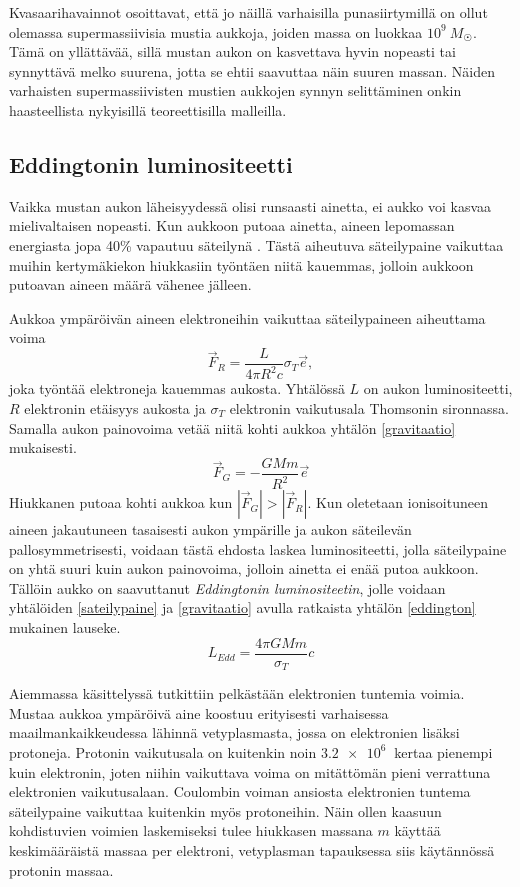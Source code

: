 \documentclass[12pt,a4paper]{article}
\begin{document}
Kvasaarihavainnot osoittavat, että jo näillä varhaisilla punasiirtymillä on ollut olemassa supermassiivisia mustia aukkoja, joiden massa on luokkaa $10^9 ~M_{\astrosun}$. Tämä on yllättävää, sillä mustan aukon on kasvettava hyvin nopeasti tai synnyttävä melko suurena, jotta se ehtii saavuttaa näin suuren massan. Näiden varhaisten supermassiivisten mustien aukkojen synnyn selittäminen onkin haasteellista nykyisillä teoreettisilla malleilla. \cite{li}

\subsection{Eddingtonin luminositeetti}
Vaikka mustan aukon läheisyydessä olisi runsaasti ainetta, ei aukko voi kasvaa mielivaltaisen nopeasti. Kun aukkoon putoaa ainetta, aineen lepomassan energiasta jopa 40\% vapautuu säteilynä \cite{pringle}. Tästä aiheutuva säteilypaine vaikuttaa muihin kertymäkiekon hiukkasiin työntäen niitä kauemmas, jolloin aukkoon putoavan aineen määrä vähenee jälleen. \cite{bartelmann}

Aukkoa ympäröivän aineen elektroneihin vaikuttaa säteilypaineen aiheuttama voima
\begin{equation}\label{sateilypaine}
	\vec{F}_R = \frac{L}{4 \pi R^2 c} \sigma_T \vec{e},
\end{equation}
joka työntää elektroneja kauemmas aukosta. Yhtälössä $L$ on aukon luminositeetti, $R$ elektronin etäisyys aukosta ja $\sigma_T$ elektronin vaikutusala Thomsonin sironnassa. Samalla aukon painovoima vetää niitä kohti aukkoa yhtälön \ref{gravitaatio} mukaisesti.
\begin{equation}\label{gravitaatio}
	\vec{F}_G = -\frac{GMm}{R^2}\vec{e}
\end{equation}
Hiukkanen putoaa kohti aukkoa kun $|\vec{F}_G|>|\vec{F}_R|$. Kun oletetaan ionisoituneen aineen jakautuneen tasaisesti aukon ympärille ja aukon säteilevän pallosymmetrisesti, voidaan tästä ehdosta laskea luminositeetti, jolla säteilypaine on yhtä suuri kuin aukon painovoima, jolloin ainetta ei enää putoa aukkoon. Tällöin aukko on saavuttanut \textit{Eddingtonin luminositeetin}, jolle voidaan yhtälöiden \ref{sateilypaine} ja \ref{gravitaatio} avulla ratkaista yhtälön \ref{eddington} mukainen lauseke. \cite{pringle} %
\begin{equation}\label{eddington}
	L_{Edd}=\frac{4 \pi GMm}{\sigma_T}c
\end{equation}

Aiemmassa käsittelyssä tutkittiin pelkästään elektronien tuntemia voimia. Mustaa aukkoa ympäröivä aine koostuu erityisesti varhaisessa maailmankaikkeudessa lähinnä vetyplasmasta, jossa on elektronien lisäksi protoneja. Protonin vaikutusala on kuitenkin noin $\SI{3,2e6}{}$ kertaa pienempi kuin elektronin, joten niihin vaikuttava voima on mitättömän pieni verrattuna elektronien vaikutusalaan. Coulombin voiman ansiosta elektronien tuntema säteilypaine vaikuttaa kuitenkin myös protoneihin. Näin ollen kaasuun kohdistuvien voimien laskemiseksi tulee hiukkasen massana $m$ käyttää keskimääräistä massaa per elektroni, vetyplasman tapauksessa siis käytännössä protonin massaa. \cite{pringle}
\end{document}
